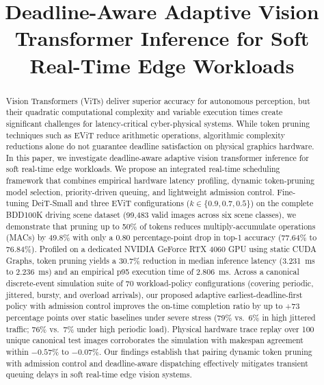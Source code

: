 \documentclass[conference]{IEEEtran}
\begin{document}
\title{Deadline-Aware Adaptive Vision Transformer Inference for Soft Real-Time Edge Workloads}

\author{
}

\maketitle

\begin{abstract}
Vision Transformers (ViTs) deliver superior accuracy for autonomous perception, but their quadratic computational complexity and variable execution times create significant challenges for latency-critical cyber-physical systems. While token pruning techniques such as EViT reduce arithmetic operations, algorithmic complexity reductions alone do not guarantee deadline satisfaction on physical graphics hardware. In this paper, we investigate deadline-aware adaptive vision transformer inference for soft real-time edge workloads. We propose an integrated real-time scheduling framework that combines empirical hardware latency profiling, dynamic token-pruning model selection, priority-driven queuing, and lightweight admission control. Fine-tuning DeiT-Small and three EViT configurations ($k \in \{0.9, 0.7, 0.5\}$) on the complete BDD100K driving scene dataset (99,483 valid images across six scene classes), we demonstrate that pruning up to 50\% of tokens reduces multiply-accumulate operations (MACs) by 49.8\% with only a 0.80 percentage-point drop in top-1 accuracy (77.64\% to 76.84\%). Profiled on a dedicated NVIDIA GeForce RTX 4060 GPU using static CUDA Graphs, token pruning yields a 30.7\% reduction in median inference latency (3.231~ms to 2.236~ms) and an empirical p95 execution time of 2.806~ms. Across a canonical discrete-event simulation suite of 70 workload-policy configurations (covering periodic, jittered, bursty, and overload arrivals), our proposed adaptive earliest-deadline-first policy with admission control improves the on-time completion ratio by up to +73 percentage points over static baselines under severe stress (79\% vs.\ 6\% in high jittered traffic; 76\% vs.\ 7\% under high periodic load). Physical hardware trace replay over 100 unique canonical test images corroborates the simulation with makespan agreement within $-0.57\%$ to $-0.07\%$. Our findings establish that pairing dynamic token pruning with admission control and deadline-aware dispatching effectively mitigates transient queuing delays in soft real-time edge vision systems.
\end{abstract}
\end{document}
